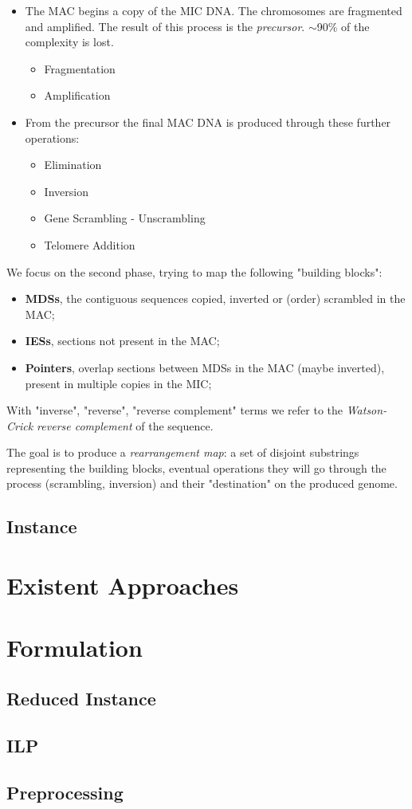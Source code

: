 \begin{itemize}
	\item The MAC begins a copy of the MIC DNA. The chromosomes are fragmented and amplified. The result of this process is the \textit{precursor}. $\sim$90\% of the complexity is lost.
	\begin{itemize}
    	\item Fragmentation
    	\item Amplification
    \end{itemize}

	\item From the precursor the final MAC DNA is produced through these further operations:
	\begin{itemize}
    	\item Elimination
    	\item Inversion
    	\item Gene Scrambling - Unscrambling
    	\item Telomere Addition
    \end{itemize}

\end{itemize}

We focus on the second phase, trying to map the following "building blocks":

\begin{itemize}
	\item \textbf{MDSs}, the contiguous sequences copied, inverted or (order) scrambled in the MAC;
	\item \textbf{IESs}, sections not present in the MAC;
	\item \textbf{Pointers}, overlap sections between MDSs in the MAC (maybe inverted), present in multiple copies in the MIC;
\end{itemize}

With "inverse", "reverse", "reverse complement" terms we refer to the \textit{Watson-Crick reverse complement} of the sequence.

The goal is to produce a \textit{rearrangement map}: a set of disjoint substrings representing the building blocks, eventual operations they will go through the process (scrambling, inversion) and their "destination" on the produced genome.

\subsection{Instance}



\section{Existent Approaches}


\section{Formulation}

\subsection{Reduced Instance}
\subsection{ILP}

\subsection{Preprocessing}
